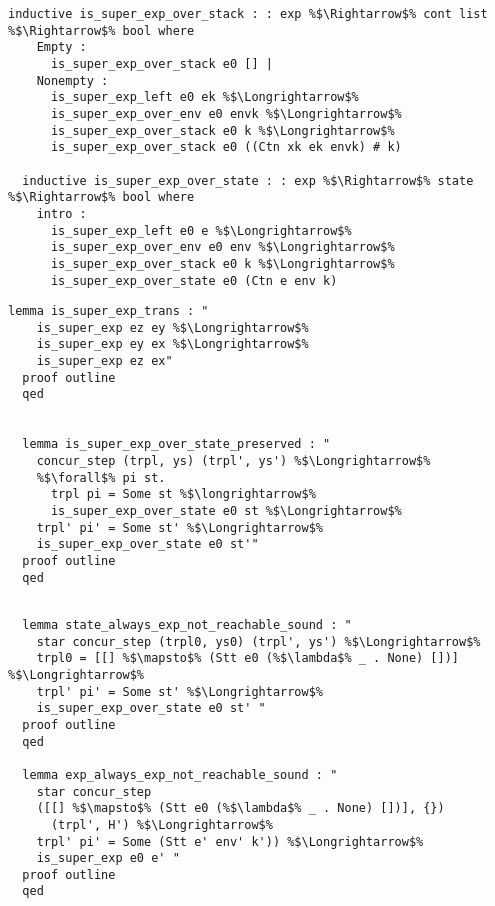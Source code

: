 \documentclass{article}
\begin{document}
\begin{lstlisting}[style=codestyle1, escapechar=\%]
  inductive is_super_exp_over_stack : : exp %$\Rightarrow$% cont list %$\Rightarrow$% bool where
    Empty :
      is_super_exp_over_stack e0 [] |
    Nonempty :
      is_super_exp_left e0 ek %$\Longrightarrow$%
      is_super_exp_over_env e0 envk %$\Longrightarrow$%
      is_super_exp_over_stack e0 k %$\Longrightarrow$%
      is_super_exp_over_stack e0 ((Ctn xk ek envk) # k)

  inductive is_super_exp_over_state : : exp %$\Rightarrow$% state %$\Rightarrow$% bool where
    intro :
      is_super_exp_left e0 e %$\Longrightarrow$%
      is_super_exp_over_env e0 env %$\Longrightarrow$%
      is_super_exp_over_stack e0 k %$\Longrightarrow$%
      is_super_exp_over_state e0 (Ctn e env k)

  \end{lstlisting}

\begin{lstlisting}[style=codestyle1, escapechar=\%]
  lemma is_super_exp_trans : "
    is_super_exp ez ey %$\Longrightarrow$%
    is_super_exp ey ex %$\Longrightarrow$%
    is_super_exp ez ex"
  proof outline 
  qed


  lemma is_super_exp_over_state_preserved : "
    concur_step (trpl, ys) (trpl', ys') %$\Longrightarrow$%
    %$\forall$% pi st.
      trpl pi = Some st %$\longrightarrow$%
      is_super_exp_over_state e0 st %$\Longrightarrow$%
    trpl' pi' = Some st' %$\Longrightarrow$%
    is_super_exp_over_state e0 st'"
  proof outline 
  qed
  \end{lstlisting}


\begin{lstlisting}[style=codestyle1, escapechar=\%]

  lemma state_always_exp_not_reachable_sound : "
    star concur_step (trpl0, ys0) (trpl', ys') %$\Longrightarrow$%
    trpl0 = [[] %$\mapsto$% (Stt e0 (%$\lambda$% _ . None) [])] %$\Longrightarrow$%
    trpl' pi' = Some st' %$\Longrightarrow$%
    is_super_exp_over_state e0 st' "
  proof outline
  qed

  lemma exp_always_exp_not_reachable_sound : "
    star concur_step
    ([[] %$\mapsto$% (Stt e0 (%$\lambda$% _ . None) [])], {})
      (trpl', H') %$\Longrightarrow$%
    trpl' pi' = Some (Stt e' env' k')) %$\Longrightarrow$%
    is_super_exp e0 e' " 
  proof outline
  qed

  \end{lstlisting}
\end{document}
